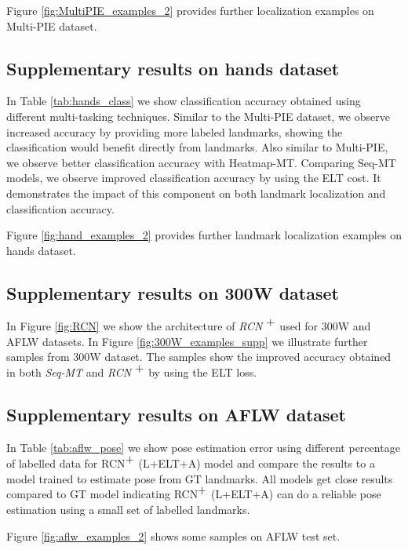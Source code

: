 \documentclass[10pt,twocolumn,letterpaper]{article}
\begin{document}
Figure \ref{fig:MultiPIE_examples_2} provides further localization examples on Multi-PIE dataset. 

\subsection{Supplementary results on hands dataset}
In Table \ref{tab:hands_class} we show classification accuracy obtained using different multi-tasking techniques. Similar to the Multi-PIE dataset, we observe increased accuracy by providing more labeled landmarks, showing the classification would benefit directly from landmarks. Also similar to Multi-PIE, we observe better classification accuracy with Heatmap-MT. Comparing Seq-MT models, we observe improved classification accuracy by using the ELT cost. It demonstrates the impact of this component on both landmark localization and classification accuracy.

Figure \ref{fig:hand_examples_2} provides further landmark localization examples on hands dataset.

\subsection{Supplementary results on 300W dataset}
In Figure \ref{fig:RCN} we show the architecture of \textit{RCN $\stackanchor{+}{}$} 
used for 300W and AFLW datasets. In Figure \ref{fig:300W_examples_supp} we illustrate further samples from 300W dataset. The samples show the improved accuracy obtained in both \textit{Seq-MT} and \textit{RCN $\stackanchor{+}{}$} by using the ELT loss.

\subsection{Supplementary results on AFLW dataset}
In Table \ref{tab:aflw_pose} we show pose estimation error using different percentage of labelled data for RCN$\stackanchor{+}{}$ (L+ELT+A) model and compare the results to a model trained to estimate pose from GT landmarks. All models get close results compared to GT model indicating RCN$\stackanchor{+}{}$ (L+ELT+A) can do a reliable pose estimation using a small set of labelled landmarks. 

Figure \ref{fig:aflw_examples_2} shows some samples on AFLW test set.
\end{document}
